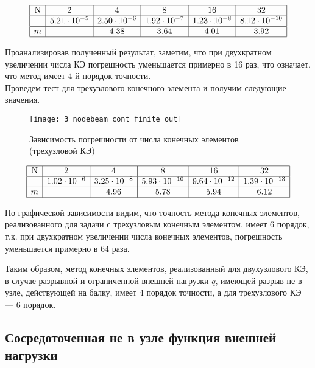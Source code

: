 \documentclass[12pt,a4paper]{article}
\begin{document}
\[
\begin{array}{|c|c|c|c|c|c|}
\hline
\text{N} & 2 & 4 & 8 & 16 & 32 \\ \hline
\Delta  & 5.21 \cdot 10^{-5} & 2.50 \cdot 10^{-6} & 1.92 \cdot 10^{-7} & 1.23 \cdot 10^{-8} & 8.12 \cdot 10^{-10} \\ \hline
m  &  & 4.38 & 3.64 & 4.01 & 3.92 \\ 
\hline
\end{array}
\]

Проанализировав полученный результат, заметим, что при двухкратном увеличении числа КЭ погрешность уменьшается примерно в 16 раз, что означает, что метод имеет 4-й порядок точности.\\


 Проведем тест для трехузлового конечного элемента и получим следующие значения. 
\begin{figure}[H]
		\centering
		\texttt{[image: 3\_nodebeam\_cont\_finite\_out]}
		\caption{Зависимость погрешности от числа конечных элементов (трехузловой КЭ)}
		\label{fig:3_nodebeam_cont_finite_out}
	\end{figure}


\[
\begin{array}{|c|c|c|c|c|c|}
\hline
\text{N} & 2 & 4 & 8 & 16 & 32\\ \hline
\Delta  & 1.02 \cdot 10^{-6} & 3.25 \cdot 10^{-8} & 5.93 \cdot 10^{-10} & 9.64 \cdot 10^{-12} & 1.39 \cdot 10^{-13}\\ \hline
m  &  &  4.96 & 5.78 & 5.94 & 6.12 \\ 
\hline
\end{array}
\]

По графической зависимости видим, что точность метода конечных элементов, реализованного для задачи с 	трехузловым конечным элементом, имеет 6 порядок, т.к. при двухкратном увеличении числа конечных элементов, погрешность уменьшается примерно в 64 раза. 


Таким образом, метод конечных элементов, реализованный для двухузлового КЭ, в случае разрывной и ограниченной внешней нагрузки $q$, имеющей разрыв не в узле, действующей на балку, имеет 4 порядок точности, а для трехузлового КЭ --- 6 порядок. 

\subsection[Сосредоточенная функция внешней нагрузки]{Сосредоточенная не в узле функция внешней нагрузки}
\end{document}
